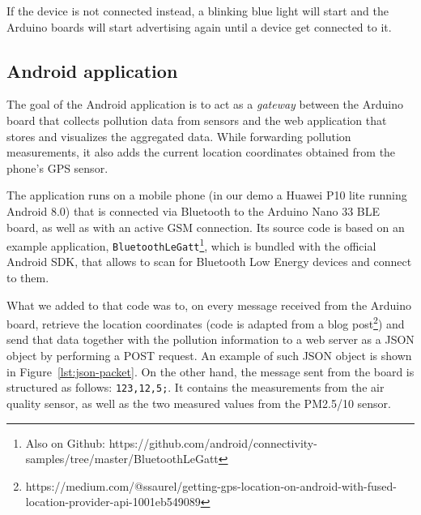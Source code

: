 \documentclass[12pt]{article}
\begin{document}
  If the device is not connected instead, a blinking blue light will start and the Arduino boards will start advertising again until a device get connected to it.
    


  \subsection{Android application}
  The goal of the Android application is to act as a \textit{gateway} between the Arduino board that collects pollution data from sensors and the web application that stores and visualizes the aggregated data. While forwarding pollution measurements, it also adds the current location coordinates obtained from the phone's GPS sensor.

  The application runs on a mobile phone (in our demo a Huawei P10 lite running Android 8.0) that is connected via Bluetooth to the Arduino Nano 33 BLE board, as well as with an active GSM connection.
  Its source code is based on an example application, \verb|BluetoothLeGatt|\footnote{Also on Github: https://github.com/android/connectivity-samples/tree/master/BluetoothLeGatt}, which is bundled with the official Android SDK, that allows to scan for Bluetooth Low Energy devices and connect to them. 

  What we added to that code was to, on every message received from the Arduino board, retrieve the location coordinates (code is adapted from a blog post\footnote{https://medium.com/@ssaurel/getting-gps-location-on-android-with-fused-location-provider-api-1001eb549089}) and send that data together with the pollution information to a web server as a JSON object by performing a POST request. An example of such JSON object is shown in Figure~\ref{lst:json-packet}. On the other hand, the message sent from the board is structured as follows: \verb|123,12,5;|. It contains the measurements from the air quality sensor, as well as the two measured values from the PM2.5/10 sensor.
\end{document}
